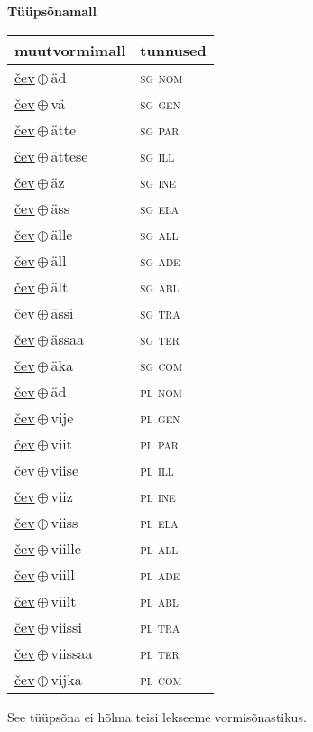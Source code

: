 

\vspace{3.5em}
\noindent \begin{minipage}{\textwidth}
\noindent \textbf{Tüüpsõnamall \,}\\

\begin{sideways}
\begin{tabular}{l l}
muutvormimall & tunnused \\
\hline
\underline{čev}\,$\oplus$\,äd & \textsc{ sg nom } \\
\underline{čev}\,$\oplus$\,vä & \textsc{ sg gen } \\
\underline{čev}\,$\oplus$\,ätte & \textsc{ sg par } \\
\underline{čev}\,$\oplus$\,ättese & \textsc{ sg ill } \\
\underline{čev}\,$\oplus$\,äz & \textsc{ sg ine } \\
\underline{čev}\,$\oplus$\,äss & \textsc{ sg ela } \\
\underline{čev}\,$\oplus$\,älle & \textsc{ sg all } \\
\underline{čev}\,$\oplus$\,äll & \textsc{ sg ade } \\
\underline{čev}\,$\oplus$\,ält & \textsc{ sg abl } \\
\underline{čev}\,$\oplus$\,ässi & \textsc{ sg tra } \\
\underline{čev}\,$\oplus$\,ässaa & \textsc{ sg ter } \\
\underline{čev}\,$\oplus$\,äka & \textsc{ sg com } \\
\underline{čev}\,$\oplus$\,äd & \textsc{ pl nom } \\
\underline{čev}\,$\oplus$\,vije & \textsc{ pl gen } \\
\underline{čev}\,$\oplus$\,viit & \textsc{ pl par } \\
\underline{čev}\,$\oplus$\,viise & \textsc{ pl ill } \\
\underline{čev}\,$\oplus$\,viiz & \textsc{ pl ine } \\
\underline{čev}\,$\oplus$\,viiss & \textsc{ pl ela } \\
\underline{čev}\,$\oplus$\,viille & \textsc{ pl all } \\
\underline{čev}\,$\oplus$\,viill & \textsc{ pl ade } \\
\underline{čev}\,$\oplus$\,viilt & \textsc{ pl abl } \\
\underline{čev}\,$\oplus$\,viissi & \textsc{ pl tra } \\
\underline{čev}\,$\oplus$\,viissaa & \textsc{ pl ter } \\
\underline{čev}\,$\oplus$\,vijka & \textsc{ pl com } \\
\end{tabular}
\end{sideways}
\label{tab:tüüpsõnamall-čeväd}

\end{minipage}

 
\vspace{1em}
\noindent See tüüpsõna ei hõlma teisi lekseeme vormi\-sõnastikus.
